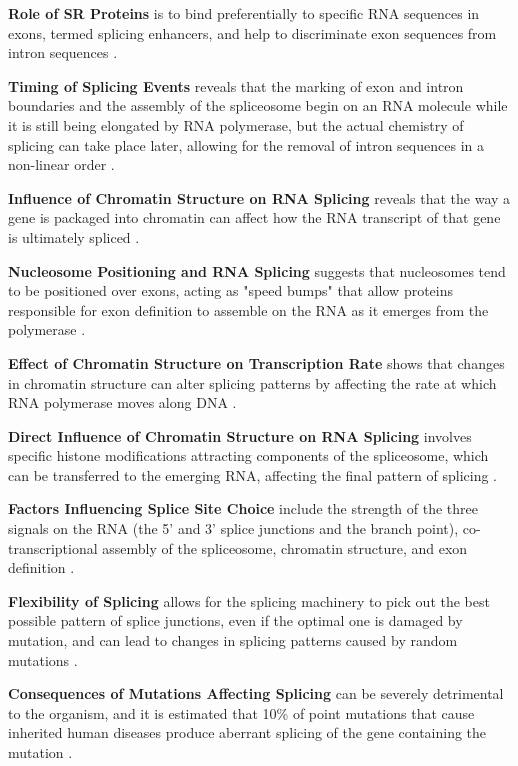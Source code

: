 \textbf{Role of SR Proteins} is to bind preferentially to specific RNA sequences in exons, termed splicing enhancers, and help to discriminate exon sequences from intron sequences \cite*{L1-Chapter6}.

\textbf{Timing of Splicing Events} reveals that the marking of exon and intron boundaries and the assembly of the spliceosome begin on an RNA molecule while it is still being elongated by RNA polymerase, but the actual chemistry of splicing can take place later, allowing for the removal of intron sequences in a non-linear order \cite*{L1-Chapter6}.

\textbf{Influence of Chromatin Structure on RNA Splicing} reveals that the way a gene is packaged into chromatin can affect how the RNA transcript of that gene is ultimately spliced \cite*{L1-Chapter6}.

\textbf{Nucleosome Positioning and RNA Splicing} suggests that nucleosomes tend to be positioned over exons, acting as "speed bumps" that allow proteins responsible for exon definition to assemble on the RNA as it emerges from the polymerase \cite*{L1-Chapter6}.

\textbf{Effect of Chromatin Structure on Transcription Rate} shows that changes in chromatin structure can alter splicing patterns by affecting the rate at which RNA polymerase moves along DNA \cite*{L1-Chapter6}.

\textbf{Direct Influence of Chromatin Structure on RNA Splicing} involves specific histone modifications attracting components of the spliceosome, which can be transferred to the emerging RNA, affecting the final pattern of splicing \cite*{L1-Chapter6}.

\textbf{Factors Influencing Splice Site Choice} include the strength of the three signals on the RNA (the 5' and 3' splice junctions and the branch point), co-transcriptional assembly of the spliceosome, chromatin structure, and exon definition \cite*{L1-Chapter6}.

\textbf{Flexibility of Splicing} allows for the splicing machinery to pick out the best possible pattern of splice junctions, even if the optimal one is damaged by mutation, and can lead to changes in splicing patterns caused by random mutations \cite*{L1-Chapter6}.

\textbf{Consequences of Mutations Affecting Splicing} can be severely detrimental to the organism, and it is estimated that 10\% of point mutations that cause inherited human diseases produce aberrant splicing of the gene containing the mutation \cite*{L1-Chapter6}.

